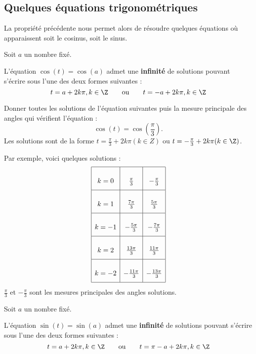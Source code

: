 \documentclass[10pt,openright,twoside,french]{book}
\begin{document}
\subsection{Quelques équations trigonométriques}
La propriété précédente nous permet alors de résoudre quelques équations où apparaissent soit le cosinus, soit le sinus.

\begin{Prop}
    Soit $a$ un nombre fixé.\par
    L'équation $\cos (t) = \cos (a)$ admet une \textbf{infinité} de solutions pouvant s'écrire sous l'une des deux formes suivantes :
    \[t = a + 2k\pi, k \in \Z \qquad \text{ou} \qquad t = -a + 2k\pi, k \in \Z\]
\end{Prop}

\begin{Exemple}
    Donner toutes les solutions de l'équation suivantes puis la mesure principale des angles qui vérifient l'équation :
    \[\cos(t) = \cos\left(\frac\pi3\right).\]
    Les solutions sont de la forme $t = \frac\pi3 + 2k\pi (k \in Z)$ ou $t = -\frac\pi3 + 2k\pi (k \in \Z)$.\par
    Par exemple, voici quelques solutions :
    \[
    \renewcommand\arraystretch{2.75}
    \begin{array}{|c|c|c|}
    \hline
        k = 0 & \frac\pi3 & -\frac\pi3\\
    \hline
        k = 1 & \frac{7\pi}{3} & \frac{5\pi}{3}\\
    \hline
        k = -1 & -\frac{5\pi}{3} & -\frac{7\pi}{3}\\
    \hline
        k = 2 & \frac{13\pi}{3} & \frac{11\pi}{3} \\
    \hline
        k = -2 & -\frac{11\pi}{3} & -\frac{13\pi}{3} \\
    \hline
    \end{array}
    \]
    $\frac \pi 3$ et $-\frac\pi3$ sont les mesures principales des angles solutions.
\end{Exemple}

\begin{Prop}
    Soit $a$ un nombre fixé.\par
    L'équation $\sin (t) = \sin (a)$ admet une \textbf{infinité} de solutions pouvant s'écrire sous l'une des deux formes suivantes :
    \[t = a + 2k\pi, k \in \Z \qquad \text{ou} \qquad t = \pi -a + 2k\pi, k \in \Z\]
\end{Prop}
\end{document}
